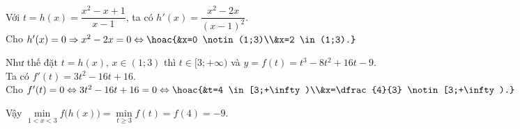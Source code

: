 \begin{ex}
{\begin{itemchoice}
Với $t=h(x)=\dfrac{x^2-x+1}{x-1}$, ta có $h'(x)=\dfrac{x^2-2x}{(x-1)^2}$.\\
Cho $h'(x)=0 \Rightarrow x^2-2x=0 \Leftrightarrow \hoac{&x=0 \notin (1;3)\\&x=2 \in (1;3).}$
\begin{center}
\end{center}
Như thế đặt $t=h(x)$, $x\in (1;3)$ thì $t \in [3;+\infty)$ và $y=f(t)=t^3-8t^2+16t-9$.\\
Ta có $f'(t)=3t^2-16t+16$.\\
Cho $f'(t)=0 \Leftrightarrow 3t^2-16t+16=0 \Leftrightarrow \hoac{&t=4 \in [3;+\infty)\\&x=\dfrac{4}{3} \notin [3;+\infty).}$
\begin{center}
\end{center}
Vậy $\min\limits_{1<x<3} f\big(h(x)\big)=\min\limits_{t \geq 3} f(t)=f(4)=-9$.
\end{itemchoice}
}
\end{ex}

